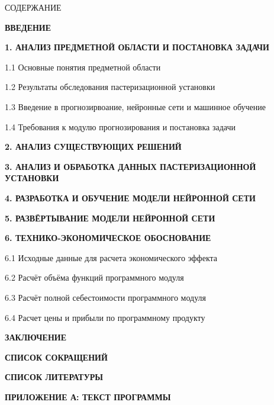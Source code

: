 {\gostTitleFont
    \redline
    СОДЕРЖАНИЕ
} 

\titlespace

{\gostFont

    \par {\bfseries ВВЕДЕНИЕ }
    \par {\bfseries 1. АНАЛИЗ ПРЕДМЕТНОЙ ОБЛАСТИ И ПОСТАНОВКА ЗАДАЧИ }
    \par 1.1 Основные понятия предметной области 
    \par 1.2 Результаты обследования пастеризационной установки  
    \par 1.3 Введение в прогнозирвоание, нейронные сети и машинное обучение  
    \par 1.4 Требования к модулю прогнозирования и постановка задачи  
    \par {\bfseries 2. АНАЛИЗ СУЩЕСТВУЮЩИХ РЕШЕНИЙ }
    \par {\bfseries 3. АНАЛИЗ И ОБРАБОТКА ДАННЫХ ПАСТЕРИЗАЦИОННОЙ УСТАНОВКИ }
    \par {\bfseries 4. РАЗРАБОТКА И ОБУЧЕНИЕ МОДЕЛИ НЕЙРОННОЙ СЕТИ }
    \par {\bfseries 5. РАЗВЁРТЫВАНИЕ МОДЕЛИ НЕЙРОННОЙ СЕТИ }
    \par {\bfseries 6. ТЕХНИКО-ЭКОНОМИЧЕСКОЕ ОБОСНОВАНИЕ }
    \par 6.1 Исходные данные для расчета экономического эффекта 
    \par 6.2 Расчёт объёма функций программного модуля 
    \par 6.3 Расчёт полной себестоимости программного модуля 
    \par 6.4 Расчет цены и прибыли по программному продукту 
    \par {\bfseries ЗАКЛЮЧЕНИЕ } 
    \par {\bfseries СПИСОК СОКРАЩЕНИЙ } 
    \par {\bfseries СПИСОК ЛИТЕРАТУРЫ } 
    \par {\bfseries ПРИЛОЖЕНИЕ А: ТЕКСТ ПРОГРАММЫ} 
    \par 
}